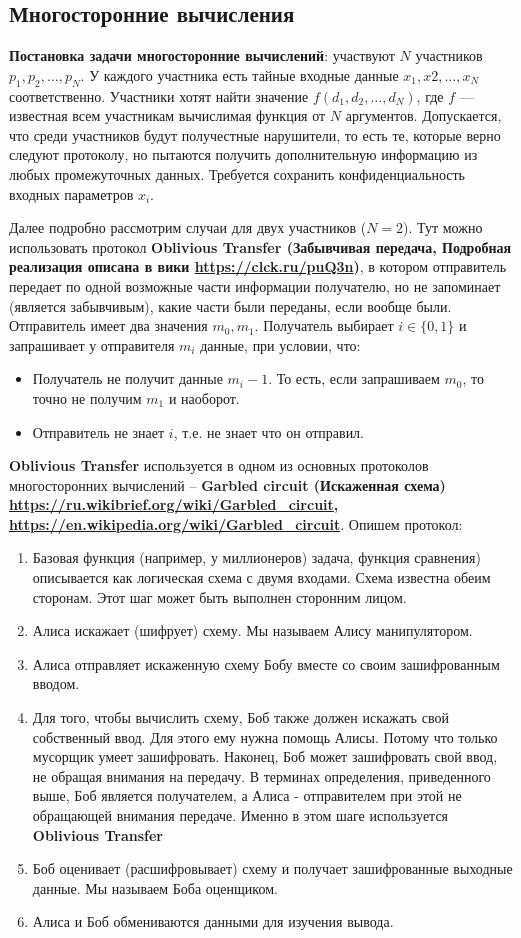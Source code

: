 \subsection{Многосторонние вычисления}
\textbf{Постановка задачи многосторонние вычислений}: участвуют $N$ участников $p_1, p_2, \dots, p_N$. У каждого участника есть тайные входные данные $x_1, x2, \dots, x_N$ соответственно. Участники хотят найти значение $f(d_1, d_2, \dots, d_N)$, где $f$ — известная всем участникам вычислимая функция от $N$ аргументов. Допускается, что среди участников будут получестные нарушители, то есть те, которые верно следуют протоколу, но пытаются получить дополнительную информацию из любых промежуточных данных. Требуется сохранить конфиденциальность входных параметров $x_i$. 

Далее подробно рассмотрим случаи для двух участников ($N=2$).
Тут можно использовать протокол \textbf{Oblivious Transfer (Забывчивая передача, Подробная реализация описана в вики \url{https://clck.ru/puQ3n})}, в котором отправитель передает по одной возможные части информации получателю, но не запоминает (является забывчивым), какие части были переданы, если вообще были. Отправитель имеет два значения $m_0, m_1$. Получатель выбирает $i \in \{0,1 \}$ и запрашивает у отправителя $m_i$ данные, при условии, что:
\begin{itemize}
	\item Получатель не получит данные $m_i-1$. То есть, если запрашиваем $m_0$, то точно не получим $m_1$ и наоборот.
	\item Отправитель не знает $i$, т.е. не знает что он отправил. 
\end{itemize}

\textbf{Oblivious Transfer} используется в одном из основных протоколов многосторонних вычислений -- \textbf{Garbled circuit
 (Искаженная схема) \url{https://ru.wikibrief.org/wiki/Garbled_circuit}, \url{https://en.wikipedia.org/wiki/Garbled_circuit}}. Опишем протокол:
\begin{enumerate}
	\item Базовая функция (например, у миллионеров) задача, функция сравнения) описывается как логическая схема с двумя входами. Схема известна обеим сторонам. Этот шаг может быть выполнен сторонним лицом.
	\item Алиса искажает (шифрует) схему. Мы называем Алису манипулятором.
	\item Алиса отправляет искаженную схему Бобу вместе со своим зашифрованным вводом.
	\item Для того, чтобы вычислить схему, Боб также должен искажать свой собственный ввод. Для этого ему нужна помощь Алисы. Потому что только мусорщик умеет зашифровать. Наконец, Боб может зашифровать свой ввод, не обращая внимания на передачу. В терминах определения, приведенного выше, Боб является получателем, а Алиса - отправителем при этой не обращающей внимания передаче. Именно в этом шаге используется \textbf{Oblivious Transfer}
	\item Боб оценивает (расшифровывает) схему и получает зашифрованные выходные данные. Мы называем Боба оценщиком.
	\item Алиса и Боб обмениваются данными для изучения вывода.
\end{enumerate}

